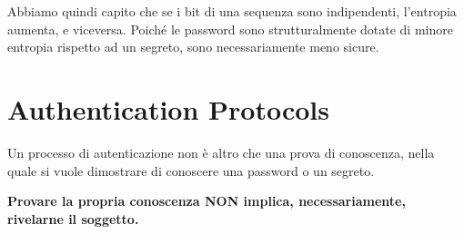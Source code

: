 \begin{remark}
Abbiamo quindi capito che se i bit di una sequenza sono indipendenti, l'entropia aumenta, e viceversa. Poiché le password sono strutturalmente dotate di minore entropia rispetto ad un segreto, sono necessariamente meno sicure.
\end{remark}
\section{Authentication Protocols}
Un processo di autenticazione non è altro che una prova di conoscenza, nella quale si vuole dimostrare di conoscere una password o un segreto. 
\begin{note}
\textbf{Provare la propria conoscenza NON implica, necessariamente, rivelarne il soggetto.}
\end{note}
